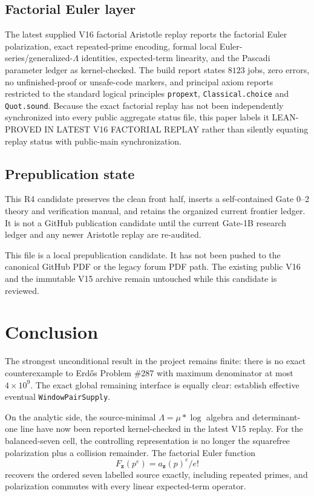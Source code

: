\documentclass[11pt]{article}
\theoremstyle{definition}
\newcommand{\1}{\mathbf 1}
\newcommand{\status}[1]{\textsf{#1}}
\begin{document}
{{{\subsection{Factorial Euler layer}

The latest supplied V16 factorial Aristotle replay reports the factorial Euler polarization,
exact repeated-prime encoding, formal local Euler-series/generalized-$\Lambda$ identities,
expected-term linearity, and the Pascadi parameter ledger as kernel-checked.  The build report
states $8123$ jobs, zero errors, no unfinished-proof or unsafe-code markers, and principal axiom
reports restricted to the standard logical principles \texttt{propext},
\texttt{Classical.choice} and \texttt{Quot.sound}.  Because the exact factorial replay has not
been independently synchronized into every public aggregate status file, this paper labels it
\status{LEAN-PROVED IN LATEST V16 FACTORIAL REPLAY} rather than silently equating replay status
with public-main synchronization.

\subsection{Prepublication state}

This R4 candidate preserves the clean front half, inserts a self-contained Gate 0--2 theory and verification manual, and retains the organized current frontier ledger.  It is not a GitHub publication candidate until the current Gate-1B research ledger and any newer Aristotle replay are re-audited.

This file is a local prepublication candidate.  It has not been pushed to the canonical
GitHub PDF or the legacy forum PDF path.  The existing public V16 and the immutable V15
archive remain untouched while this candidate is reviewed.

\section{Conclusion}

The strongest unconditional result in the project remains finite: there is no exact
counterexample to Erd\H{o}s Problem \#287 with maximum denominator at most
$4\times10^9$.  The exact global remaining interface is equally clear: establish effective
eventual \texttt{WindowPairSupply}.

On the analytic side, the source-minimal $\Lambda=\mu*\log$ algebra and determinant-one
line have now been reported kernel-checked in the latest V15 replay.  For the balanced-seven
cell, the controlling representation is no longer the squarefree polarization plus a
collision remainder.  The factorial Euler function
\[
F_{\mathbf z}(p^e)=a_{\mathbf z}(p)^e/e!
\]
recovers the ordered seven labelled source exactly, including repeated primes, and
polarization commutes with every linear expected-term operator.

}}}
\end{document}
